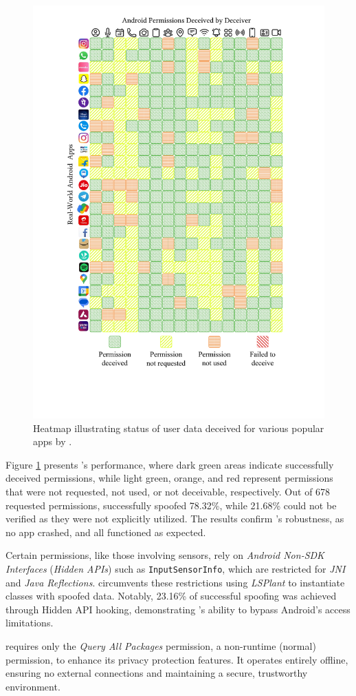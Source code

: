 \begin{figure}[t]
    \centering
    \includegraphics[width=0.6\linewidth]{Figures/Introduction/heatmap.pdf}
    \caption{Heatmap illustrating status of user data deceived for various popular apps by \framework{}.}
    \label{fig:intro_heatmap}
\end{figure}

Figure \ref{fig:intro_heatmap} presents \framework{}'s performance, where dark green areas indicate successfully deceived permissions, while light green, orange, and red represent permissions that were not requested, not used, or not deceivable, respectively. Out of 678 requested permissions, \framework{} successfully spoofed 78.32\%, while 21.68\% could not be verified as they were not explicitly utilized. The results confirm \framework{}'s robustness, as no app crashed, and all functioned as expected.

 Certain permissions, like those involving sensors, rely on \textit{Android Non-SDK Interfaces} (\textit{Hidden APIs}) such as \texttt{InputSensorInfo}, which are restricted for \textit{JNI} and \textit{Java Reflections}. \framework{} circumvents these restrictions using \textit{LSPlant} to instantiate classes with spoofed data. Notably, 23.16\% of successful spoofing was achieved through Hidden API hooking, demonstrating \framework{}'s ability to bypass Android's access limitations.

 \framework{} requires only the \textit{Query All Packages} permission, a non-runtime (normal) permission, to enhance its privacy protection features. It operates entirely offline, ensuring no external connections and maintaining a secure, trustworthy environment.
